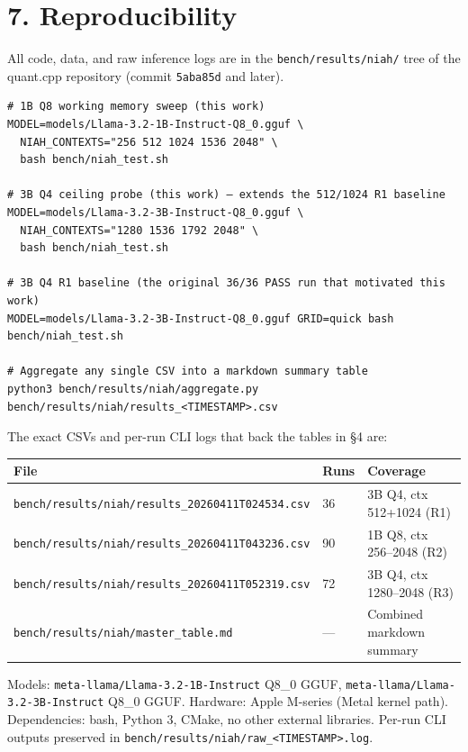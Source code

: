 \documentclass[11pt]{article}
\begin{document}
\section*{7. Reproducibility}


All code, data, and raw inference logs are in the \texttt{bench/results/niah/} tree of the quant.cpp repository (commit \texttt{5aba85d} and later).


\begin{lstlisting}
# 1B Q8 working memory sweep (this work)
MODEL=models/Llama-3.2-1B-Instruct-Q8_0.gguf \
  NIAH_CONTEXTS="256 512 1024 1536 2048" \
  bash bench/niah_test.sh

# 3B Q4 ceiling probe (this work) — extends the 512/1024 R1 baseline
MODEL=models/Llama-3.2-3B-Instruct-Q8_0.gguf \
  NIAH_CONTEXTS="1280 1536 1792 2048" \
  bash bench/niah_test.sh

# 3B Q4 R1 baseline (the original 36/36 PASS run that motivated this work)
MODEL=models/Llama-3.2-3B-Instruct-Q8_0.gguf GRID=quick bash bench/niah_test.sh

# Aggregate any single CSV into a markdown summary table
python3 bench/results/niah/aggregate.py bench/results/niah/results_<TIMESTAMP>.csv
\end{lstlisting}


The exact CSVs and per-run CLI logs that back the tables in §4 are:


\begin{center}
\begin{tabular}{lll}
\toprule
File & Runs & Coverage \\
\midrule
\texttt{bench/results/niah/results\_20260411T024534.csv} & 36 & 3B Q4, ctx 512+1024 (R1) \\
\texttt{bench/results/niah/results\_20260411T043236.csv} & 90 & 1B Q8, ctx 256–2048 (R2) \\
\texttt{bench/results/niah/results\_20260411T052319.csv} & 72 & 3B Q4, ctx 1280–2048 (R3) \\
\texttt{bench/results/niah/master\_table.md} & — & Combined markdown summary \\
\bottomrule
\end{tabular}
\end{center}


Models: \texttt{meta-llama/Llama-3.2-1B-Instruct} Q8\_0 GGUF, \texttt{meta-llama/Llama-3.2-3B-Instruct} Q8\_0 GGUF. Hardware: Apple M-series (Metal kernel path). Dependencies: bash, Python 3, CMake, no other external libraries. Per-run CLI outputs preserved in \texttt{bench/results/niah/raw\_<TIMESTAMP>.log}.
\end{document}
